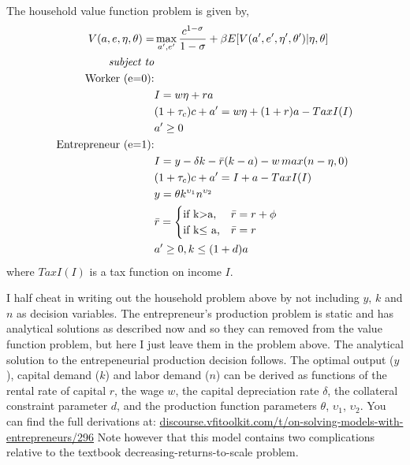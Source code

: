 \documentclass[11pt,fleqn]{article}
\begin{document}
The household value function problem is given by,
\begin{align*}
 V(a,e,\eta,\theta)  = & \max_{a',e'} \frac{c^{1-\sigma}}{1-\sigma} + \beta E [V(a',e',\eta',\theta')|\eta,\theta] \\
 \text{\textit{subject to}} & \\
 \text{Worker (e=0):} &  \\
                      & I=w \eta+r a \\
                      & (1+\tau_c)c+a'=w \eta+(1+r) a-TaxI(I) \\
                      & a'\geq 0     \\
 \text{Entrepreneur (e=1):} &  \\
                      & I=y-\delta k-\bar{r} (k-a)-w \, max(n-\eta,0) \\
                      & (1+\tau_c)c+a'=I+a-TaxI(I) \\
                      & y=\theta k^{\upsilon_1} n^{\upsilon_2} \\
                      & \bar{r}=\begin{cases}
                                   \text{if k$>$a,} & \bar{r}=r+\phi \\
                                   \text{if k$\leq$ a,} & \bar{r}=r \\
                                \end{cases} \\
                      & a'\geq 0, k\leq (1+d)a                  
\end{align*}
where $TaxI(I)$ is a tax function on income $I$.

I half cheat in writing out the household problem above by not including $y$, $k$ and $n$ as decision variables. The entrepreneur's production problem is static and has analytical solutions as described now and so they can removed from the value function problem, but here I just leave them in the problem above.
The analytical solution to the entrepeneurial production decision follows. The optimal output ($y$), capital demand ($k$) and labor demand ($n$) can be derived as functions of the rental rate of capital $r$, the wage $w$, the capital depreciation rate $\delta$, the collateral constraint parameter $d$, and the production function parameters $\theta$, $\upsilon_1$, $\upsilon_2$. You can find the full derivations at:
\href{http://discourse.vfitoolkit.com/t/on-solving-models-with-entrepreneurs/296}{discourse.vfitoolkit.com/t/on-solving-models-with-entrepreneurs/296}
Note however that this model contains two complications relative to the textbook decreasing-returns-to-scale problem.
\end{document}
